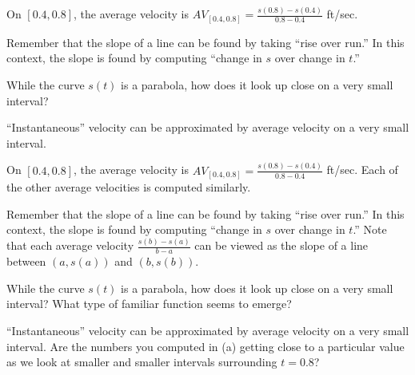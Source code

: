 \begin{smallhint}
\ba
	\item On $[0.4,0.8]$, the average velocity is $AV_{[0.4,0.8]} = \frac{s(0.8)-s(0.4)}{0.8-0.4}$ ft/sec.
	\item Remember that the slope of a line can be found by taking ``rise over run.''  In this context, the slope is found by computing ``change in $s$ over change in $t$.''
	\item While the curve $s(t)$ is a parabola, how does it look up close on a very small interval? 
	\item ``Instantaneous'' velocity can be approximated by average velocity on a very small interval.
\ea
\end{smallhint}
\begin{bighint}
\ba
	\item On $[0.4,0.8]$, the average velocity is $AV_{[0.4,0.8]} = \frac{s(0.8)-s(0.4)}{0.8-0.4}$ ft/sec.  Each of the other average velocities is computed similarly.
	\item Remember that the slope of a line can be found by taking ``rise over run.''  In this context, the slope is found by computing ``change in $s$ over change in $t$.''  Note that each average velocity $\frac{s(b)-s(a)}{b-a}$ can be viewed as the slope of a line between $(a,s(a))$ and $(b,s(b))$.
	\item While the curve $s(t)$ is a parabola, how does it look up close on a very small interval?  What type of familiar function seems to emerge?
	\item ``Instantaneous'' velocity can be approximated by average velocity on a very small interval.  Are the numbers you computed in (a) getting close to a particular value as we look at smaller and smaller intervals surrounding $t = 0.8$?
\ea
\end{bighint}
